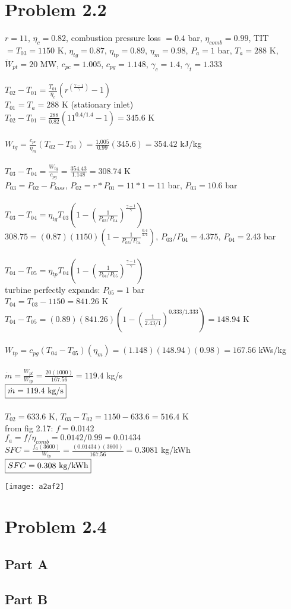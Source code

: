 \documentclass{article}
\begin{document}
\section*{Problem 2.2}
$r=11$, $\eta_c=0.82$, combustion pressure loss $=0.4$ bar, $\eta_{comb}=0.99$,
TIT$=T_{03}=1150$ K, $\eta_{tg}=0.87$, $\eta_{tp}=0.89$, $\eta_{m}=0.98$, $P_a=1$ bar,
$T_a=288$ K, $\dot{W}_{pt}=20$ MW, $c_{pc}=1.005$, $c_{pg}=1.148$, $\gamma_c=1.4$,
$\gamma_t=1.333$ \\\\
$T_{02} - T_{01}=\frac{T_{01}}{\eta_c}(r^{(\frac{\gamma-1}{\gamma})}-1)$ \\
$T_{01}=T_a=288$ K (stationary inlet) \\
$T_{02} - T_{01}=\frac{288}{0.82}(11^{0.4/1.4}-1)=345.6$ K \\\\
$W_{tg}=\frac{c_{pc}}{\eta_m}(T_{02} - T_{01})=\frac{1.005}{0.99}(345.6)=354.42$ kJ/kg \\\\
$T_{03} - T_{04}=\frac{W_{tg}}{c_{pg}}=\frac{354.43}{1.148}=308.74$ K \\
$P_{03} = P_{02} - P_{loss}$, $P_{02}=r*P_{01}=11*1=11$ bar, $P_{03}=10.6$ bar \\\\
$T_{03} - T_{04}=\eta_{tg}T_{03}(1 - (\frac{1}{P_{03}/P_{04}})^\frac{\gamma-1}{\gamma})$ \\
$308.75=(0.87)(1150)(1-\frac{1}{P_{03}/P_{04}}^{\frac{0.4}{1.4}})$, $P_{03}/P_{04}=4.375$,
$P_{04}=2.43$ bar \\\\
$T_{04} - T_{05}=\eta_{tp}T_{04}(1 - (\frac{1}{P_{04}/P_{05}})^\frac{\gamma-1}{\gamma})$ \\
turbine perfectly expands: $P_{05}=1$ bar \\
$T_{04} = T_{03}-1150 = 841.26$ K \\
$T_{04} - T_{05}=(0.89)(841.26)(1 - (\frac{1}{2.43/1})^{0.333/1.333})=148.94$ K \\\\
$W_{tp}=c_{pg}(T_{04} - T_{05})(\eta_{m})=(1.148)(148.94)(0.98)=167.56$ kWs/kg \\\\
$\dot{m}=\frac{W_{pt}}{W_{tp}}=\frac{20(1000)}{167.56}=119.4$ kg/s\\
$\fbox{$\dot{m}=119.4$ kg/s}$ \\\\
$T_{02}=633.6$ K, $T_{03}-T_{02}=1150-633.6=516.4$ K \\
from fig 2.17: $f=0.0142$ \\
$f_a = f/\eta_{comb} = 0.0142/0.99=0.01434$ \\
$SFC = \frac{f_a(3600)}{W_{tp}}=\frac{(0.01434)(3600)}{167.56}=0.3081$ kg/kWh \\
$\fbox{$SFC=0.308$ kg/kWh}$
\begin{center}
    \texttt{[image: a2af2]}  
\end{center}

\section*{Problem 2.4}
\subsection*{Part A}
\subsection*{Part B}
\end{document}
